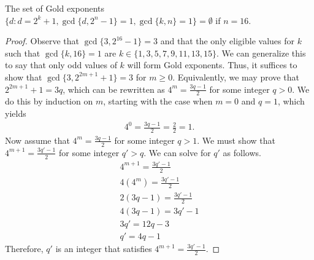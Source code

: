 \begin{thm}
The set of Gold exponents $\{d : d = 2^k + 1, \gcd\{d, 2^n - 1\} = 1, \gcd\{k, n\} = 1\} = \emptyset$ if $n = 16$.
\end{thm}
\begin{proof}
Observe that $\gcd\{3, 2^{16} - 1\} = 3$ and that the only eligible values for $k$ such that $\gcd\{k, 16\} = 1$ are $k \in \{1, 3, 5, 7, 9, 11, 13, 15\}$. We can generalize this to say that only odd values of $k$ will form Gold exponents. Thus, it suffices to show that $\gcd\{3, 2^{2m + 1} + 1\} = 3$ for $m \geq 0$. Equivalently, we may prove that $2^{2m + 1} + 1 = 3q$, which can be rewritten as $4^m = \frac{3q - 1}{2}$ for some integer $q > 0$. We do this by induction on $m$, starting with the case when $m = 0$ and $q = 1$, which yields
\begin{align*}
4^0 = \frac{3q - 1}{2} = \frac{2}{2} = 1.
\end{align*}
Now assume that $4^{m} = \frac{3q - 1}{2}$ for some integer $q > 1$. We must show that $4^{m + 1} = \frac{3q' - 1}{2}$ for some integer $q' > q$. We can solve for $q'$ as follows.
\begin{align*}
4^{m + 1} = \frac{3q' - 1}{2} \\
4(4^m) = \frac{3q' - 1}{2} \\
2(3q - 1) = \frac{3q' - 1}{2} \\
4(3q - 1) = 3q' - 1 \\
3q' = 12q - 3 \\
q' = 4q - 1
\end{align*}
Therefore, $q'$ is an integer that satisfies $4^{m + 1} = \frac{3q' - 1}{2}$.
\end{proof}

